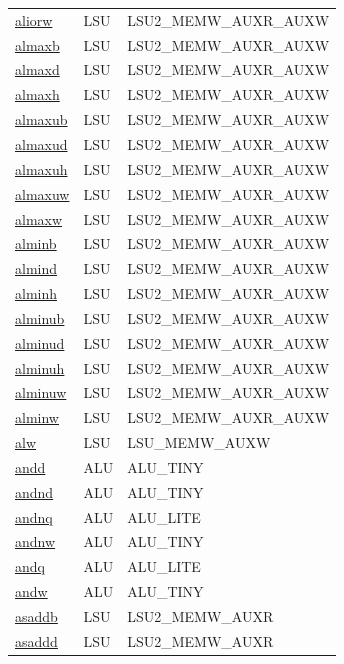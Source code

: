 \begin{small}
\begin{longtable}[l]{l l l}
\hyperlink{lvx.aliorw}{aliorw} & LSU & LSU2\_MEMW\_AUXR\_AUXW \\ 
\hyperlink{lvx.almaxb}{almaxb} & LSU & LSU2\_MEMW\_AUXR\_AUXW \\ 
\hyperlink{lvx.almaxd}{almaxd} & LSU & LSU2\_MEMW\_AUXR\_AUXW \\ 
\hyperlink{lvx.almaxh}{almaxh} & LSU & LSU2\_MEMW\_AUXR\_AUXW \\ 
\hyperlink{lvx.almaxub}{almaxub} & LSU & LSU2\_MEMW\_AUXR\_AUXW \\ 
\hyperlink{lvx.almaxud}{almaxud} & LSU & LSU2\_MEMW\_AUXR\_AUXW \\ 
\hyperlink{lvx.almaxuh}{almaxuh} & LSU & LSU2\_MEMW\_AUXR\_AUXW \\ 
\hyperlink{lvx.almaxuw}{almaxuw} & LSU & LSU2\_MEMW\_AUXR\_AUXW \\ 
\hyperlink{lvx.almaxw}{almaxw} & LSU & LSU2\_MEMW\_AUXR\_AUXW \\ 
\hyperlink{lvx.alminb}{alminb} & LSU & LSU2\_MEMW\_AUXR\_AUXW \\ 
\hyperlink{lvx.almind}{almind} & LSU & LSU2\_MEMW\_AUXR\_AUXW \\ 
\hyperlink{lvx.alminh}{alminh} & LSU & LSU2\_MEMW\_AUXR\_AUXW \\ 
\hyperlink{lvx.alminub}{alminub} & LSU & LSU2\_MEMW\_AUXR\_AUXW \\ 
\hyperlink{lvx.alminud}{alminud} & LSU & LSU2\_MEMW\_AUXR\_AUXW \\ 
\hyperlink{lvx.alminuh}{alminuh} & LSU & LSU2\_MEMW\_AUXR\_AUXW \\ 
\hyperlink{lvx.alminuw}{alminuw} & LSU & LSU2\_MEMW\_AUXR\_AUXW \\ 
\hyperlink{lvx.alminw}{alminw} & LSU & LSU2\_MEMW\_AUXR\_AUXW \\ 
\hyperlink{lvx.alw}{alw} & LSU & LSU\_MEMW\_AUXW \\ 
\hyperlink{lvx.andd}{andd} & ALU & ALU\_TINY \\ 
\hyperlink{lvx.andnd}{andnd} & ALU & ALU\_TINY \\ 
\hyperlink{lvx.andnq}{andnq} & ALU & ALU\_LITE \\ 
\hyperlink{lvx.andnw}{andnw} & ALU & ALU\_TINY \\ 
\hyperlink{lvx.andq}{andq} & ALU & ALU\_LITE \\ 
\hyperlink{lvx.andw}{andw} & ALU & ALU\_TINY \\ 
\hyperlink{lvx.asaddb}{asaddb} & LSU & LSU2\_MEMW\_AUXR \\ 
\hyperlink{lvx.asaddd}{asaddd} & LSU & LSU2\_MEMW\_AUXR \\ 

\end{longtable}
\end{small}
